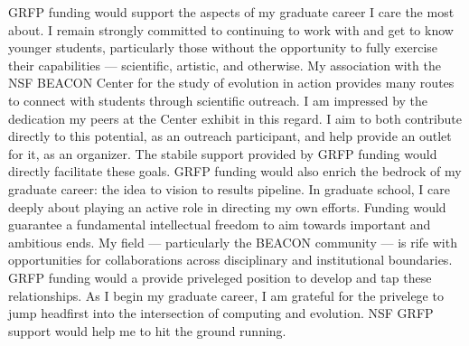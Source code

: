 GRFP funding would support the aspects of my graduate career I care the most about.
I remain strongly committed to continuing to work with and get to know younger students, particularly those without the opportunity to fully exercise their capabilities --- scientific, artistic, and otherwise.
My association with the NSF BEACON Center for the study of evolution in action provides many routes to connect with students through scientific outreach.
I am impressed by the dedication my peers at the Center exhibit in this regard.
I aim to both contribute directly to this potential, as an outreach participant, and help provide an outlet for it, as an organizer.
The stabile support provided by GRFP funding would directly facilitate these goals.
GRFP funding would also enrich the bedrock of my graduate career: the idea to vision to results pipeline.
In graduate school, I care deeply about playing an active role in directing my own efforts.
Funding would guarantee a fundamental intellectual freedom to aim towards important and ambitious ends.
My field --- particularly the BEACON community --- is rife with opportunities for collaborations across disciplinary and institutional boundaries.
GRFP funding would a provide priveleged position to develop and tap these relationships.
As I begin my graduate career, I am grateful for the privelege to jump headfirst into the intersection of computing and evolution.
NSF GRFP support would help me to hit the ground running.
